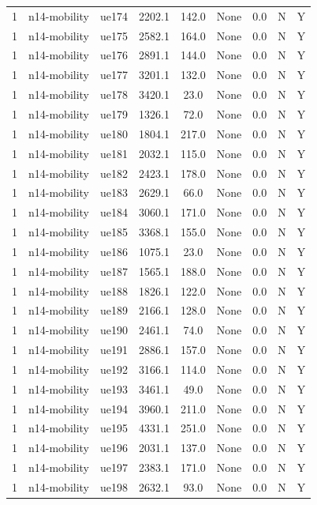 \begin{table}[ht]
\begin{tabular}{|c|c|c|c|c|c|c|c|c|}
1 & n14-mobility & ue174 & 2202.1 & 142.0 & None & 0.0 & N & Y \\
1 & n14-mobility & ue175 & 2582.1 & 164.0 & None & 0.0 & N & Y \\
1 & n14-mobility & ue176 & 2891.1 & 144.0 & None & 0.0 & N & Y \\
1 & n14-mobility & ue177 & 3201.1 & 132.0 & None & 0.0 & N & Y \\
1 & n14-mobility & ue178 & 3420.1 & 23.0 & None & 0.0 & N & Y \\
1 & n14-mobility & ue179 & 1326.1 & 72.0 & None & 0.0 & N & Y \\
1 & n14-mobility & ue180 & 1804.1 & 217.0 & None & 0.0 & N & Y \\
1 & n14-mobility & ue181 & 2032.1 & 115.0 & None & 0.0 & N & Y \\
1 & n14-mobility & ue182 & 2423.1 & 178.0 & None & 0.0 & N & Y \\
1 & n14-mobility & ue183 & 2629.1 & 66.0 & None & 0.0 & N & Y \\
1 & n14-mobility & ue184 & 3060.1 & 171.0 & None & 0.0 & N & Y \\
1 & n14-mobility & ue185 & 3368.1 & 155.0 & None & 0.0 & N & Y \\
1 & n14-mobility & ue186 & 1075.1 & 23.0 & None & 0.0 & N & Y \\
1 & n14-mobility & ue187 & 1565.1 & 188.0 & None & 0.0 & N & Y \\
1 & n14-mobility & ue188 & 1826.1 & 122.0 & None & 0.0 & N & Y \\
1 & n14-mobility & ue189 & 2166.1 & 128.0 & None & 0.0 & N & Y \\
1 & n14-mobility & ue190 & 2461.1 & 74.0 & None & 0.0 & N & Y \\
1 & n14-mobility & ue191 & 2886.1 & 157.0 & None & 0.0 & N & Y \\
1 & n14-mobility & ue192 & 3166.1 & 114.0 & None & 0.0 & N & Y \\
1 & n14-mobility & ue193 & 3461.1 & 49.0 & None & 0.0 & N & Y \\
1 & n14-mobility & ue194 & 3960.1 & 211.0 & None & 0.0 & N & Y \\
1 & n14-mobility & ue195 & 4331.1 & 251.0 & None & 0.0 & N & Y \\
1 & n14-mobility & ue196 & 2031.1 & 137.0 & None & 0.0 & N & Y \\
1 & n14-mobility & ue197 & 2383.1 & 171.0 & None & 0.0 & N & Y \\
1 & n14-mobility & ue198 & 2632.1 & 93.0 & None & 0.0 & N & Y \\

\end{tabular}
\end{table}
